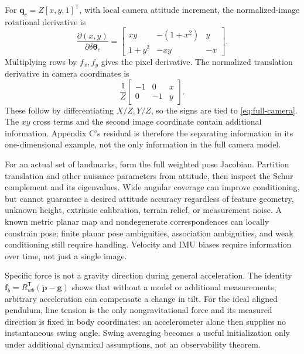 For $\boldsymbol q_c=Z[x,y,1]^{\mathsf T}$, with local camera attitude
increment, the normalized-image rotational derivative is
\begin{equation}
 \frac{\partial(x,y)}{\partial\delta\boldsymbol\theta_c}
 =\begin{bmatrix}
 xy&-(1+x^2)&y\\
 1+y^2&-xy&-x
 \end{bmatrix}.
 \label{eq:full-image-rotation}
\end{equation}
Multiplying rows by $f_x,f_y$ gives the pixel derivative. The normalized
translation derivative in camera coordinates is
\begin{equation}
 \frac1Z\begin{bmatrix}-1&0&x\\0&-1&y\end{bmatrix}.
\end{equation}
These follow by differentiating $X/Z,Y/Z$, so the signs are tied to
\eqref{eq:full-camera}. The $xy$ cross terms and the second image
coordinate contain additional information. Appendix C's residual is
therefore the separating information in its one-dimensional example,
not the only information in the full camera model.

For an actual set of landmarks, form the full weighted pose Jacobian.
Partition translation and other nuisance parameters from attitude,
then inspect the Schur complement and its eigenvalues. Wide angular
coverage can improve conditioning, but cannot guarantee a desired
attitude accuracy regardless of feature geometry, unknown height,
extrinsic calibration, terrain relief, or measurement noise. A known
metric planar map and nondegenerate correspondences can locally constrain
pose; finite planar pose ambiguities, association ambiguities, and
weak conditioning still require handling. Velocity and IMU biases require
information over time, not just a single image.

Specific force is not a gravity direction during general acceleration.
The identity $\boldsymbol f_b=R_{wb}^{\mathsf T}
(\ddot{\boldsymbol p}-\boldsymbol g)$ shows that without a model or
additional measurements, arbitrary acceleration can compensate a change
in tilt. For the ideal aligned pendulum, line tension is the only
nongravitational force and its measured direction is fixed in body
coordinates: an accelerometer alone then supplies no instantaneous swing
angle. Swing averaging becomes a useful initialization only under
additional dynamical assumptions, not an observability theorem.

